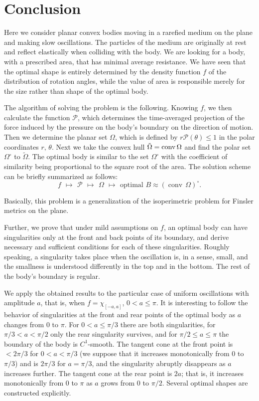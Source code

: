 \documentclass[a4paper,12pt]{article}
\DeclareMathOperator{\conv}{conv}
\newcommand {\PPP}{\mathcal{P}}
\theoremstyle{remark}
\theoremstyle{definition}
\begin{document}
\section{Conclusion}

Here we consider planar convex bodies moving in a rarefied medium on the plane and making slow oscillations. The particles of the medium are originally at rest and reflect elastically when colliding with the body. We are looking for a body, with a prescribed area, that has minimal average resistance.
We have seen that the optimal shape is entirely determined by the density function $f$ of the distribution of rotation angles, while the value of area is responsible merely for the size rather than shape of the optimal body.

The algorithm of solving the problem is the following. Knowing $f$, we then calculate the function $\PPP$, which determines the time-averaged projection of the force induced by the pressure on the body's boundary on the direction of motion. Then we determine the planar set $\Omega$, which is defined by $r \PPP(\theta) \le 1$ in the polar coordinates $r,\, \theta$. Next we take the convex hull $\tilde\Omega = \rm{conv}\,\Omega$ and find the polar set $\Omega^{\circ}$ to $\tilde\Omega$. The optimal body is similar to the set $\Omega^{\circ}$ with the coefficient of similarity being proportional to the square root of the area. The solution scheme can be briefly summarized as follows:
$$
f\, \ \mapsto\, \ \PPP\, \ \mapsto\, \ \Omega\ \, \mapsto\ \, \text{optimal } B \approx
(\conv\,\Omega)^\circ.
$$

Basically, this problem is a generalization of the isoperimetric problem for Finsler metrics on the plane.

Further, we prove that under mild assumptions on $f$, an optimal body can have singularities only at the front and back points of its boundary, and derive necessary and sufficient conditions for each of these singularities. Roughly speaking, a singularity takes place when the oscillation is, in a sense, small, and the smallness is understood differently in the top and in the bottom. The rest of the body's boundary is regular.

We apply the obtained results to the particular case of uniform oscillations with amplitude $a$, that is, when $f = \chi_{[-a,a]}$, $0<a\le\pi$.
It is interesting to follow the behavior of singularities at the front and rear points of the optimal body as $a$ changes from 0 to $\pi$. For $0<a\le\pi/3$ there are both singularities, for $\pi/3<a<\pi/2$ only the rear singularity survives, and for $\pi/2\le a\le\pi$ the boundary of the body is $C^1$-smooth. The tangent cone at the front point is $<2\pi/3$ for $0<a<\pi/3$ (we suppose that it increases monotonically from 0 to $\pi/3$) and is $2\pi/3$ for $a=\pi/3$, and the singularity abruptly disappears as $a$ increases further. The tangent cone at the rear point is $2a$; that is, it increases monotonically from 0 to $\pi$ as $a$ grows from 0 to $\pi/2.$
Several optimal shapes are constructed explicitly.
\end{document}
